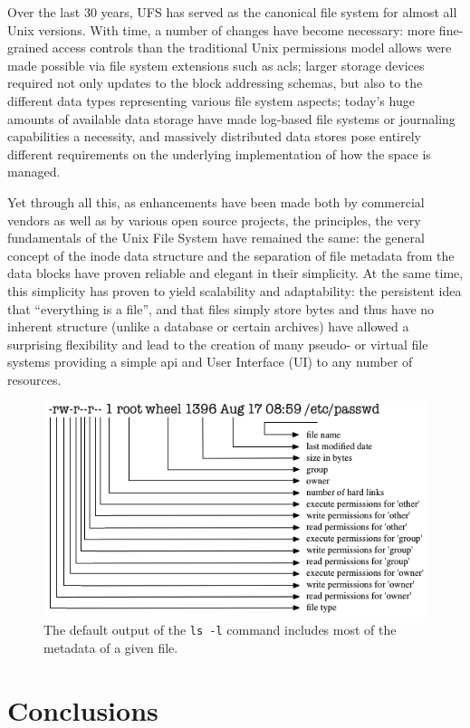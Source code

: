 Over the last 30 years, UFS has served as the
canonical file system for almost all Unix versions.
With time, a number of changes have become necessary:
more fine-grained access controls than the traditional
Unix permissions model allows were made possible via
file system extensions such as
\gls{acl}s; larger storage
devices required not only updates to the block
addressing schemas, but also to the different data
types representing various file system aspects;
today's huge amounts of available data storage have
made log-based file systems or journaling capabilities
a necessity, and massively distributed data stores
pose entirely different requirements on the underlying
implementation of how the space is managed.

Yet through all this, as enhancements have been made
both by commercial vendors as well as by various open
source projects, the principles, the very fundamentals
of the Unix File System have remained the same:  the
general concept of the inode data structure and the
separation of file metadata from the data blocks have
proven reliable and elegant in their simplicity.  At
the same time, this simplicity has proven to yield
scalability and adaptability: the persistent idea that
``everything is a file'', and that files simply
store bytes and thus have no inherent structure
(unlike a database or certain archives) have allowed a
surprising flexibility and lead to the creation of
many pseudo- or virtual file systems providing a
simple \gls{api} and User Interface (UI) to any number
of resources.

\begin{figure}[t]
	\centering
	\includegraphics[width=.75\textwidth]{04/pics/ls-l}
		\caption[File Metadata]{The default output of the {\tt ls -l}
			command includes most of the metadata of a given
			file.
			\label{fig:file-systems:ls-l}}
\end{figure}

\section{Conclusions}
\label{file systems:conclusions}

